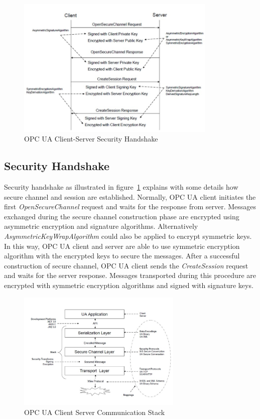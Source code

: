 \begin{figure}[!htbp]
	\centering
	\includegraphics[width=0.85\textwidth]{opc_ua_shs.jpg}
		\caption{OPC UA Client-Server Security Handshake \cite{O2}}
	\label{fig:opc_ua_cs_shs}
\end{figure}

\subsection{Security Handshake}
Security handshake as illustrated in figure~\ref{fig:opc_ua_cs_shs} explains with some details how secure channel and session are established. Normally, OPC UA client initiates the first \emph{OpenSecureChannel} request and waits for the response from server. Messages exchanged during the secure channel construction phase are encrypted using asymmetric encryption and signature algorithms. Alternatively \emph{AsymmetricKeyWrapAlgorithm} could also be applied to encrypt symmetric keys. In this way, OPC UA client and server are able to use symmetric encryption algorithm with the encrypted keys to secure the messages. After a successful construction of secure channel, OPC UA client sends the \emph{CreateSession} request and waits for the server response. Messages transported during this procedure are encrypted with symmetric encryption algorithms and signed with signature keys.
\begin{figure}[!htbp]
	\centering
	\includegraphics[width=0.7\textwidth]{opc_ua_commstack.jpg}
		\caption{OPC UA Client Server Communication Stack \cite{O2}}
	\label{fig:opc_ua_commstack}
\end{figure}

